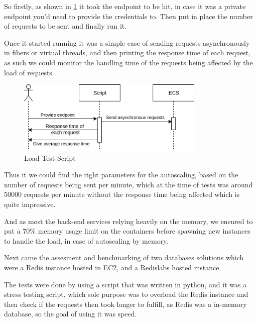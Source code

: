 So firstly, as shown in \ref{fig:loadtest} it took the endpoint to be hit, in case
it was a private endpoint you'd need to provide the credentials to. Then put in place
the number of requests to be sent and finally run it.

Once it started running it was a simple case of sending requests asynchronously in fibers
or virtual threads, and then printing the response time of each request, as such we could
monitor the handling time of the requests being affected by the load of requests.

\begin{figure}[!ht]
    \centering
    \includegraphics[width=0.8\textwidth]{images/scriptdos.png}
    \caption{\footnotesize{Load Test Script}}
    \label{fig:loadtest}
\end{figure}


Thus it we could find the right parameters for the autoscaling, based on the number of
requests being sent per minute, which at the time of tests was around 50000 requests per
minute without the response time being affected which is quite impressive.

And as most the back-end services relying heavily on the memory, we ensured to put a 70\%
memory usage limit on the containers before spawning new instances to handle the load, in
case of autoscaling by memory.

Next came the assesment and benchmarking of two databases solutions which were a Redis
instance hosted in EC2, and a Redislabs hosted instance.

The tests were done by using a script that was written in python, and it was a
stress testing script, which sole purpose was to overload the Redis instance 
and then check if the requests then took longer to fulfill, as Redis was a in-memory
database, so the goal of using it was speed.

